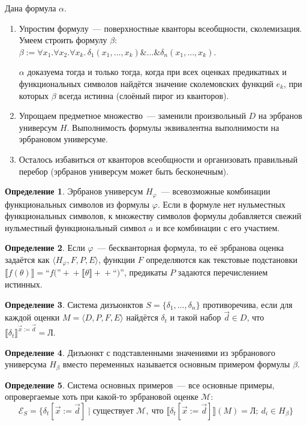 \documentclass[a4paper,11pt]{article}
\theoremstyle{definition}
\newtheorem*{dfn}{Определение}
\newcommand{\False}{\text{Л}}
\newcommand{\amp}{\mathbin{\&}}
\begin{document}
Дана формула $\alpha$.
\begin{enumerate}
\item Упростим формулу~--- поверхностные кванторы всеобщности, сколемизация.
  Умеем строить формулу $\beta$: $\beta := \forall x_1.\forall x_2.\forall
  x_k.\,\delta_1(x_1, \dots, x_k) \amp \dots \amp \delta_n(x_1, \dots, x_k)$.

  $\alpha$ доказуема тогда и только тогда, когда при всех оценках предикатных и
  функциональных символов найдётся значение сколемовских функций $e_k$, при
  которых $\beta$ всегда истинна (слоёный пирог из кванторов).
\item Упрощаем предметное множество~--- заменили произвольный $D$ на эрбранов
  универсум $H$. Выполнимость формулы эквивалентна выполнимости на эрбрановом
  универсуме.
\item Осталось избавиться от кванторов всеобщности и организовать правильный
  перебор (эрбранов универсум может быть бесконечным).
\end{enumerate}
\begin{dfn}
Эрбранов универсум $H_\varphi$~--- всевозможные комбинации функциональных
символов из формулы $\varphi$. Если в формуле нет нульместных функциональных
символов, к множеству символов формулы добавляется свежий нульместный
функциональный символ $a$ и все комбинации с его участием.
\end{dfn}
\begin{dfn}
Если $\varphi$~--- бескванторная формула, то её эрбранова оценка задаётся как
$\langle H_\varphi, F, P, E\rangle$, функции $F$ определяются как текстовые
подстановки $\llbracket f(\theta)\rrbracket = \text{``}f(\text{''} +\!+
\llbracket\theta\rrbracket +\!+ \text{``)''}$, предикаты $P$ задаются
перечислением истинных.
\end{dfn}
\begin{dfn}
Система дизъюнктов $S = \{\delta_1, \dots, \delta_n\}$ противоречива, если для
каждой оценки $M = \langle D, P, F, E\rangle$ найдётся $\delta_t$ и такой набор
$\vec d \in D$, что $\llbracket\delta_t\rrbracket^{\vec x := \vec d} = \False$.
\end{dfn}
\begin{dfn}
Дизъюнкт с подставленными значениями из эрбранового универсума $H_\beta$ вместо
переменных называется основным примером формулы $\beta$.
\end{dfn}
\begin{dfn}
Система основных примеров~--- все основные примеры, опровергаемые хоть при
какой-то эрбрановой оценке $\mathcal{M}$:
\[
\mathcal{E}_S = \{\delta_t[\vec x := \vec d] \mid \text{существует } \mathcal{M},\ \text{что } \llbracket\delta_t[\vec x := \vec d]\rrbracket(M) = \False;\ d_i \in H_\beta\}
\]
\end{dfn}
\end{document}

